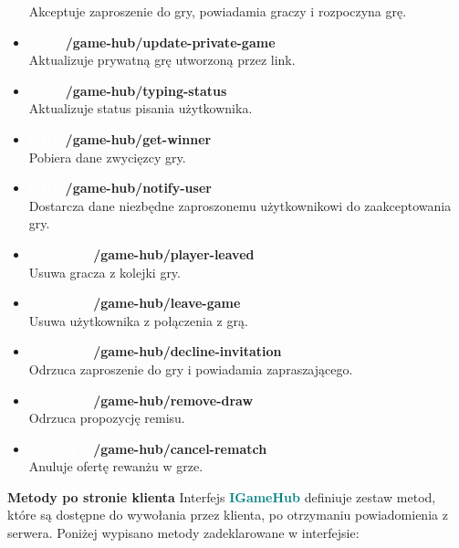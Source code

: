 \documentclass[12pt,a4paper]{article}
\begin{document}
\begin{itemize}
    Akceptuje zaproszenie do gry, powiadamia graczy i rozpoczyna grę.
    \item \textbf{\colorbox{orange!90}{\textcolor{white}{PUT}} /game-hub/update-private-game}\\
    Aktualizuje prywatną grę utworzoną przez link.
    \item \textbf{\colorbox{orange!90}{\textcolor{white}{PUT}} /game-hub/typing-status}\\
    Aktualizuje status pisania użytkownika.
    \item \textbf{\colorbox{cyan!90}{\textcolor{white}{GET}} /game-hub/get-winner}\\
    Pobiera dane zwycięzcy gry.
    \item \textbf{\colorbox{cyan!90}{\textcolor{white}{GET}} /game-hub/notify-user}\\
    Dostarcza dane niezbędne zaproszonemu użytkownikowi do zaakceptowania gry.
    \item \textbf{\colorbox{red!90}{\textcolor{white}{DELETE}} /game-hub/player-leaved}\\
    Usuwa gracza z kolejki gry.
    \item \textbf{\colorbox{red!90}{\textcolor{white}{DELETE}} /game-hub/leave-game}\\
    Usuwa użytkownika z połączenia z grą.
    \item \textbf{\colorbox{red!90}{\textcolor{white}{DELETE}} /game-hub/decline-invitation}\\
    Odrzuca zaproszenie do gry i powiadamia zapraszającego.
    \item \textbf{\colorbox{red!90}{\textcolor{white}{DELETE}} /game-hub/remove-draw}\\
    Odrzuca propozycję remisu.
    \item \textbf{\colorbox{red!90}{\textcolor{white}{DELETE}} /game-hub/cancel-rematch}\\
    Anuluje ofertę rewanżu w grze.
\end{itemize}

\newpage

\noindent \textbf{Metody po stronie klienta}
Interfejs \textcolor{teal}{\textbf{IGameHub}} definiuje zestaw metod, które są dostępne do wywołania przez klienta, po otrzymaniu powiadomienia z serwera. Poniżej wypisano metody zadeklarowane w interfejsie:
\end{document}
